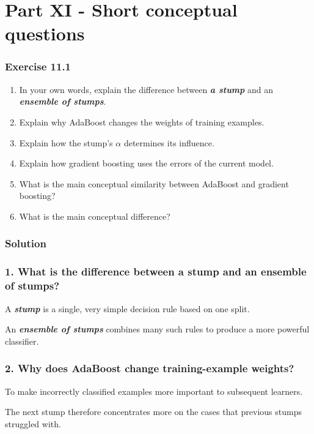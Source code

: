 \documentclass[10pt]{article}
\begin{document}
\clearpage
\section*{Part XI - Short conceptual questions}
\subsubsection*{Exercise 11.1}
\begin{enumerate}
\item
In your own words, explain the difference between \textbf{\textit{a stump}} and an \textbf{\textit{ensemble of stumps}}.

\item
Explain why AdaBoost changes the weights of training examples.

\item
Explain how the stump's $\alpha$ determines its influence.

\item
Explain how gradient boosting uses the errors of the current model.

\item
What is the main conceptual similarity between AdaBoost and gradient boosting?

\item
What is the main conceptual difference?

\end{enumerate}
\begingroup\color{red}

\subsubsection*{Solution}
\subsubsection*{1. What is the difference between a stump and an ensemble of stumps?}
A \textbf{\textit{stump}} is a single, very simple decision rule based on one split.

An \textbf{\textit{ensemble of stumps}} combines many such rules to produce a more powerful classifier.

\subsubsection*{2. Why does AdaBoost change training-example weights?}
To make incorrectly classified examples more important to subsequent learners.

The next stump therefore concentrates more on the cases that previous stumps struggled with.
\end{document}
